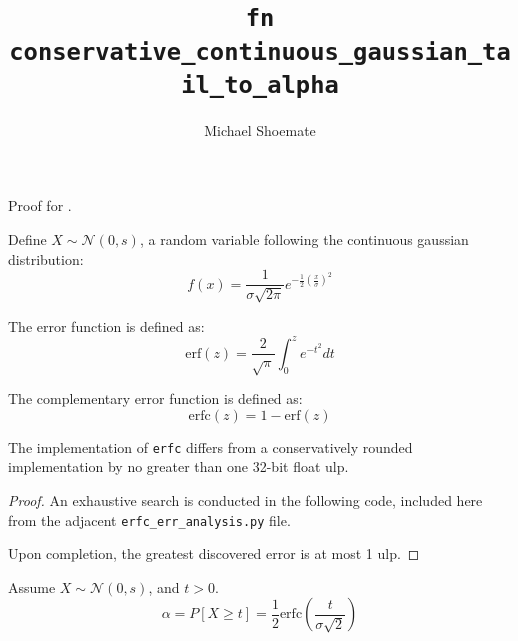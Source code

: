 \documentclass{article}
\title{\texttt{fn conservative\_continuous\_gaussian\_tail\_to\_alpha}}
\author{Michael Shoemate}
\begin{document}
\maketitle

\contrib

Proof for .

\begin{definition}
    \label{gaussian}
    Define $X \sim \mathcal{N}(0, s)$, a random variable following the continuous gaussian distribution:
    \begin{equation}
        f(x) = \frac{1}{\sigma \sqrt{2 \pi}} e^{-\frac{1}{2}\left( \frac{x}{\sigma}\right)^2}
    \end{equation}
\end{definition}

\begin{definition}
    \label{erf}
    The error function is defined as:
    \begin{equation}
        \mathrm{erf}(z) = \frac{2}{\sqrt{\pi}} \int_{0}^{z} e^{-t^2} dt
    \end{equation}
\end{definition}

\begin{definition}
    \label{erfc}
    The complementary error function is defined as:
    \begin{equation}
        \mathrm{erfc}(z) = 1 - \mathrm{erf}(z)
    \end{equation}
\end{definition}

\begin{lemma}
    \label{erfc-err}
    The implementation of \texttt{erfc} differs from a conservatively rounded implementation by no greater than one 32-bit float ulp.
\end{lemma}

\begin{proof}
    An exhaustive search is conducted in the following code, 
    included here from the adjacent \texttt{erfc\_err\_analysis.py} file.
    \label{sec:erfc-err-check}
    

    Upon completion, the greatest discovered error is at most 1 ulp.
\end{proof}

\begin{theorem}
    Assume $X \sim \mathcal{N}(0, s)$, and $t > 0$.
    \begin{equation}
        \alpha = P[X \ge t] = \frac{1}{2} \mathrm{erfc}\left(\frac{t}{\sigma \sqrt{2}}\right)
    \end{equation}
\end{theorem}
\end{document}
